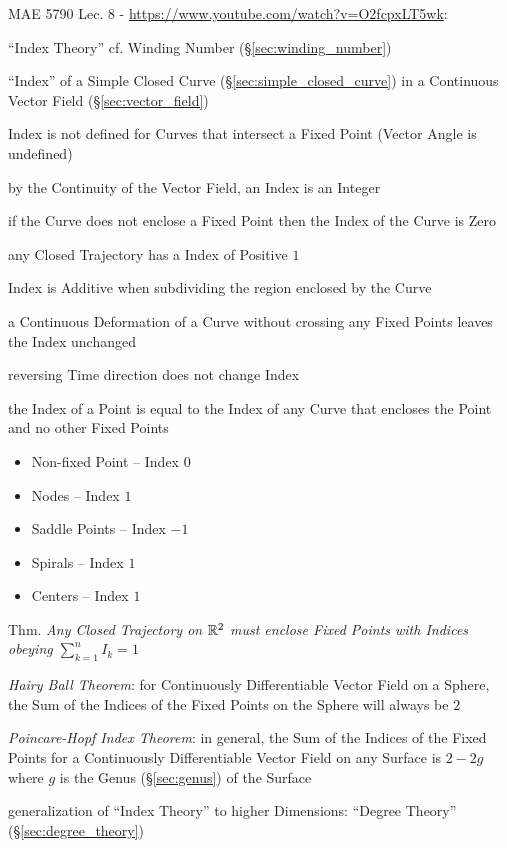 MAE 5790 Lec. 8 - \url{https://www.youtube.com/watch?v=O2fcpxLT5wk}:

``Index Theory'' \fist cf. Winding Number (\S\ref{sec:winding_number})

``Index'' of a Simple Closed Curve (\S\ref{sec:simple_closed_curve}) in a
Continuous Vector Field (\S\ref{sec:vector_field})

Index is not defined for Curves that intersect a Fixed Point (Vector Angle is
undefined)

by the Continuity of the Vector Field, an Index is an Integer

if the Curve does not enclose a Fixed Point then the Index of the Curve is Zero

any Closed Trajectory has a Index of Positive $1$

Index is Additive when subdividing the region enclosed by the Curve

a Continuous Deformation of a Curve without crossing any Fixed Points leaves
the Index unchanged

reversing Time direction does not change Index

the Index of a Point is equal to the Index of any Curve that encloses the Point
and no other Fixed Points

\begin{itemize}
  \item Non-fixed Point -- Index $0$
  \item Nodes -- Index $1$
  \item Saddle Points -- Index $-1$
  \item Spirals -- Index $1$
  \item Centers -- Index $1$
\end{itemize}

Thm. \emph{Any Closed Trajectory on $\mathbb{R}^2$ must enclose Fixed Points with
  Indices obeying $\sum_{k=1}^n I_k = 1$}

\emph{Hairy Ball Theorem}: for Continuously Differentiable Vector Field
on a Sphere, the Sum of the Indices of the Fixed Points on the Sphere will
always be $2$

\emph{Poincare-Hopf Index Theorem}: in general, the Sum of the Indices of the
Fixed Points for a Continuously Differentiable Vector Field on any Surface is
$2 - 2g$ where $g$ is the Genus (\S\ref{sec:genus}) of the Surface

generalization of ``Index Theory'' to higher Dimensions: ``Degree Theory''
(\S\ref{sec:degree_theory})


\asterism

